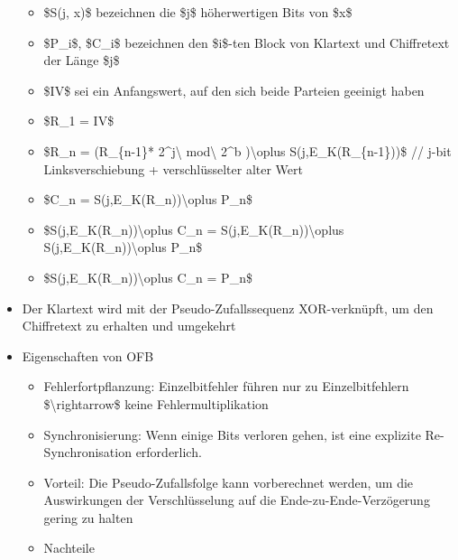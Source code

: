 \documentclass[a4paper]{article}
\begin{document}
\begin{multicols}{3}
\begin{itemize}
              \begin{itemize}
                  \item
                        \$S(j, x)\$ bezeichnen die \$j\$ höherwertigen Bits von \$x\$
                  \item
                        \$P\_i\$, \$C\_i\$ bezeichnen den \$i\$-ten Block von Klartext und
                        Chiffretext der Länge \$j\$
                  \item
                        \$IV\$ sei ein Anfangswert, auf den sich beide Parteien geeinigt
                        haben
                  \item
                        \$R\_1 = IV\$
                  \item
                        \$R\_n = (R\_\{n-1\}* 2\^{}j\textbackslash{} mod\textbackslash{}
                        2\^{}b )\textbackslash oplus S(j,E\_K(R\_\{n-1\}))\$ // j-bit
                        Linksverschiebung + verschlüsselter alter Wert
                  \item
                        \$C\_n = S(j,E\_K(R\_n))\textbackslash oplus P\_n\$
                  \item
                        \$S(j,E\_K(R\_n))\textbackslash oplus C\_n =
                        S(j,E\_K(R\_n))\textbackslash oplus
                        S(j,E\_K(R\_n))\textbackslash oplus P\_n\$
                  \item
                        \$S(j,E\_K(R\_n))\textbackslash oplus C\_n = P\_n\$
              \end{itemize}
        \item
              Der Klartext wird mit der Pseudo-Zufallssequenz XOR-verknüpft, um den
              Chiffretext zu erhalten und umgekehrt
        \item
              Eigenschaften von OFB

              \begin{itemize}
                  \item
                        Fehlerfortpflanzung: Einzelbitfehler führen nur zu Einzelbitfehlern
                        \$\textbackslash rightarrow\$ keine Fehlermultiplikation
                  \item
                        Synchronisierung: Wenn einige Bits verloren gehen, ist eine
                        explizite Re-Synchronisation erforderlich.
                  \item
                        Vorteil: Die Pseudo-Zufallsfolge kann vorberechnet werden, um die
                        Auswirkungen der Verschlüsselung auf die Ende-zu-Ende-Verzögerung
                        gering zu halten
                  \item
                        Nachteile


\end{itemize}
\end{itemize}
\end{multicols}
\end{document}
